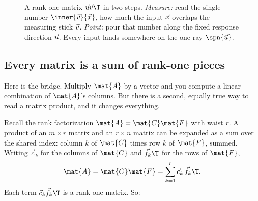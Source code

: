 \begin{figure}[H]
\centering
{}
\caption{A rank-one matrix $\protect\vec{u}\protect\vec{v}\protect\T$ in two steps.
\emph{Measure:} read the single number $\protect\inner{\vec v}{\vec x}$, how much the
input $\protect\vec{x}$ overlaps the measuring stick $\protect\vec{v}$.
\emph{Point:} pour that number along the fixed response direction
$\protect\vec{u}$. Every input lands somewhere on the one ray
$\protect\spn\{\protect\vec{u}\}$.}
\label{ch16:rankone}
\end{figure}

\subsection{Every matrix is a sum of rank-one pieces}

Here is the bridge. Multiply $\mat{A}$ by a vector and you compute a linear
combination of $\mat{A}$'s columns. But there is a second, equally true way to
read a matrix product, and it changes everything.

Recall the rank factorization $\mat{A}=\mat{C}\mat{F}$ with waist $r$. A product
of an $m\times r$ matrix and an $r\times n$ matrix can be expanded as a sum over
the shared index: column $k$ of $\mat{C}$ times row $k$ of $\mat{F}$, summed.
Writing $\vec{c}_k$ for the columns of $\mat{C}$ and $\vec{f}_k\T$ for the rows
of $\mat{F}$,
\[
  \mat{A} = \mat{C}\mat{F}
  = \sum_{k=1}^{r} \vec{c}_k\,\vec{f}_k\T.
\]
Each term $\vec{c}_k\vec{f}_k\T$ is a rank-one matrix. So:

